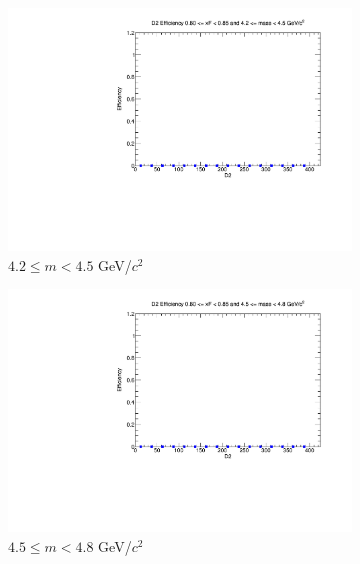 \documentclass[11pt]{article}
\begin{document}
\begin{figure}[p]
    \centering
    \begin{subfigure}[b]{0.32\textwidth}
        \centering
        \includegraphics[width=\textwidth]{./kTrackerEfficiencyPlots/D2_Efficiency_xF16_mass0.pdf}
        \caption{$4.2 \leq m < 4.5$ GeV/$c^2$}
    \end{subfigure}\hfill
    \begin{subfigure}[b]{0.32\textwidth}
        \centering
        \includegraphics[width=\textwidth]{./kTrackerEfficiencyPlots/D2_Efficiency_xF16_mass1.pdf}
        \caption{$4.5 \leq m < 4.8$ GeV/$c^2$}
    \end{subfigure}\hfill
    \begin{subfigure}[b]{0.32\textwidth}
        \centering

\end{subfigure}
\end{figure}
\end{document}
